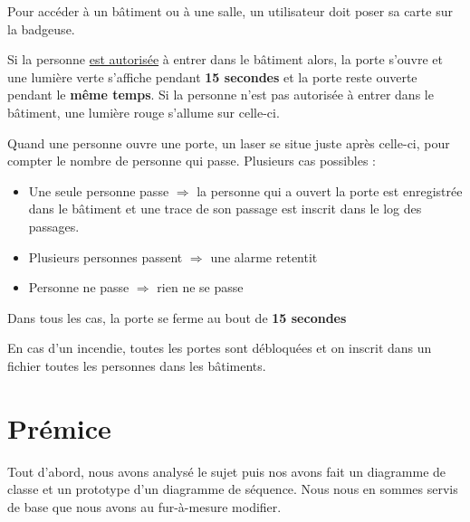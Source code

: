 \documentclass[a4paper,10pt]{article}
\begin{document}
        Pour accéder à un bâtiment ou à une salle, un utilisateur doit poser sa carte sur la badgeuse.
        \newline
        \par Si la personne \underline{est autorisée} à entrer dans le bâtiment alors, la porte s'ouvre et une lumière verte s'affiche pendant \textbf{15 secondes} et la porte reste ouverte pendant le \textbf{même temps}.
        \newline
        Si la personne n'est pas autorisée à entrer dans le bâtiment, une lumière rouge s'allume sur celle-ci.
        \newline
        \par
        Quand une personne ouvre une porte, un laser se situe juste après celle-ci, pour compter le nombre de personne qui passe. Plusieurs cas possibles :
        \begin{itemize}
            \item Une seule personne passe $\Rightarrow$ la personne qui a ouvert la porte est enregistrée dans le bâtiment et une trace de son passage est inscrit dans le log des passages.
            \item Plusieurs personnes passent $\Rightarrow$ une alarme retentit
            \item Personne ne passe $\Rightarrow$ rien ne se passe
        \end{itemize}

        Dans tous les cas, la porte se ferme au bout de \textbf{15 secondes}
        \newline

        \par En cas d'un incendie, toutes les portes sont débloquées et on inscrit dans un fichier toutes les personnes dans les bâtiments.
        \pagebreak
    \section{Prémice}
    Tout d'abord, nous avons analysé le sujet puis nos avons fait un diagramme de classe et un prototype d'un diagramme de séquence. Nous nous en sommes servis de base que nous avons au fur-à-mesure modifier.
\end{document}
